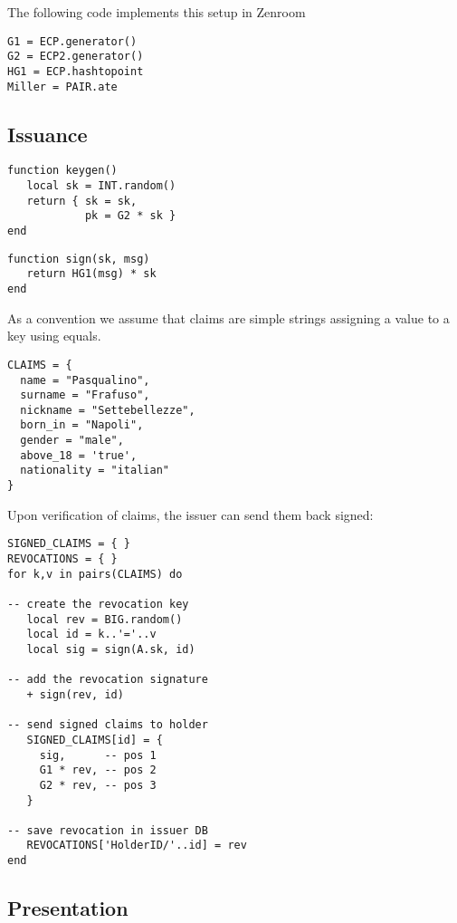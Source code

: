 \documentclass[conference]{IEEEtran}
\begin{document}
The following code implements this setup in Zenroom
\begin{lstlisting}[style=lua,caption={Setup}]
G1 = ECP.generator()
G2 = ECP2.generator()
HG1 = ECP.hashtopoint
Miller = PAIR.ate
\end{lstlisting}


\subsection{Issuance}

\begin{lstlisting}[style=lua,caption={Issuer key generation}]
function keygen()
   local sk = INT.random()
   return { sk = sk,
			pk = G2 * sk }
end
\end{lstlisting}

\begin{lstlisting}[style=lua,caption={Issuer signature}]
function sign(sk, msg)
   return HG1(msg) * sk
end
\end{lstlisting}

As a convention we assume that claims are simple strings assigning a
value to a key using equals.

\begin{lstlisting}[style=lua,caption={Holder requests signature of claims}]
CLAIMS = {
  name = "Pasqualino",
  surname = "Frafuso",
  nickname = "Settebellezze",
  born_in = "Napoli",
  gender = "male",
  above_18 = 'true',
  nationality = "italian"
}
\end{lstlisting}

Upon verification of claims, the issuer can send them back signed:

\begin{lstlisting}[style=lua,caption={Issuer signs claims}]
SIGNED_CLAIMS = { }
REVOCATIONS = { }
for k,v in pairs(CLAIMS) do

-- create the revocation key
   local rev = BIG.random()
   local id = k..'='..v
   local sig = sign(A.sk, id)

-- add the revocation signature
   + sign(rev, id)

-- send signed claims to holder
   SIGNED_CLAIMS[id] = {
     sig,      -- pos 1
     G1 * rev, -- pos 2
     G2 * rev, -- pos 3
   }

-- save revocation in issuer DB
   REVOCATIONS['HolderID/'..id] = rev
end
\end{lstlisting}

\subsection{Presentation}
\end{document}
